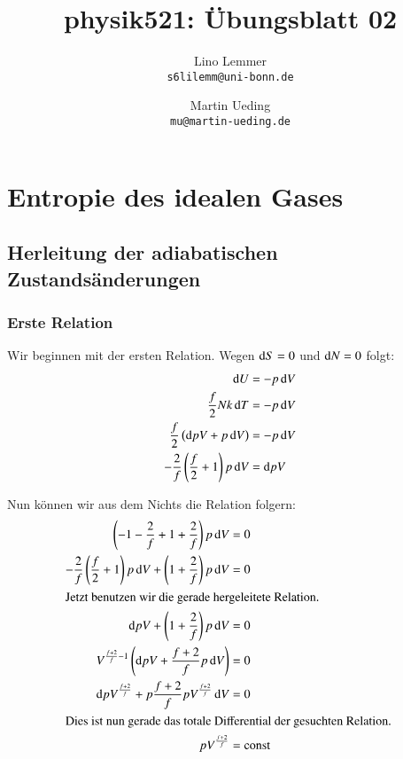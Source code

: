 

\setcounter{section}{1}
\renewcommand\thesection{H\,2.\arabic{section}}
\renewcommand\thesubsection{\thesection.\alph{subsection}}

\title{physik521: Übungsblatt 02}
\author{%
    Lino Lemmer \\ \small{\texttt{s6lilemm@uni-bonn.de}}
    \and
    Martin Ueding \\ \small{\texttt{mu@martin-ueding.de}}
}


\maketitle
\section{Entropie des idealen Gases}


\subsection{Herleitung der adiabatischen Zustandsänderungen}

\subsubsection{Erste Relation}

Wir beginnen mit der ersten Relation. Wegen $\dif S = 0$ und $\dif N = 0$ folgt:
\begin{align*}
    \dif U &= - p \dif V \\
    \frac f2 N k \dif T &= - p \dif V \\
    \frac f2 \left( \dif p V + p \dif V \right) &= - p \dif V \\
        - \frac 2f \left( \frac f2 + 1 \right) p \dif V &= \dif p V
\end{align*}

Nun können wir aus dem Nichts die Relation folgern:
\begin{align*}
    \left( -1 - \frac 2f + 1 + \frac 2f \right) p \dif V &= 0 \\
    - \frac 2f \left( \frac f2 + 1 \right) p \dif V + \left( 1 + \frac 2f \right) p \dif V &= 0 \\
    \intertext{%
        Jetzt benutzen wir die gerade hergeleitete Relation.
    }
    \dif p V + \left( 1 + \frac 2f \right) p \dif V &= 0 \\
    V^{\frac{f+2}f -1} \left( \dif p V + \frac{f+2}f p \dif V \right) &= 0 \\
    \dif p V^{\frac{f+2}f} + p \frac{f+2}f p V^{\frac{f+2}f} \dif V &= 0 \\
    \intertext{%
        Dies ist nun gerade das totale Differential der
        gesuchten Relation.
    }
    p V^{\frac{f+2}f} &= \text{const}
\end{align*}

